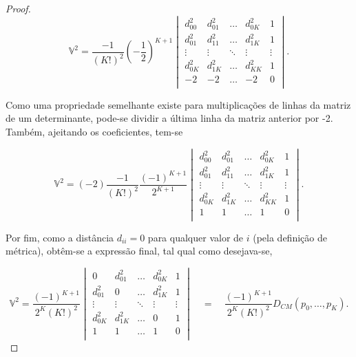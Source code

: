 \begin{teorema}
\begin{proof}
		\begin{equation*}
			\mathbb{V}^2 = \frac{-1}{(K!)^2}\left( -\frac{1}{2}\right)^{K+1} 
			\begin{vmatrix}
				d^2_{00} & d^2_{01} & \ldots & d^2_{0K} & 1\\ 
				d^2_{01} & d^2_{11} & \ldots & d^2_{1K} & 1\\ 
				\vdots & \vdots & \ddots & \vdots & \vdots \\ 
				d^2_{0K} & d^2_{1K} & \ldots & d^2_{KK} & 1\\
				-2 & -2 & \ldots & -2 & 0\\ 
			\end{vmatrix}.
		\end{equation*}
		
		\noindent Como uma propriedade semelhante existe para multiplicações de linhas da matriz de um determinante, pode-se dividir a última linha da matriz anterior por -2. Também, ajeitando os coeficientes, tem-se
		
		\begin{equation*}
			\mathbb{V}^2 = (-2) \frac{-1}{(K!)^2}\frac{(-1)^{K+1}}{2^{K+1}} 
			\begin{vmatrix}
				d^2_{00} & d^2_{01} & \ldots & d^2_{0K} & 1\\ 
				d^2_{01} & d^2_{11} & \ldots & d^2_{1K} & 1\\ 
				\vdots & \vdots & \ddots & \vdots & \vdots \\ 
				d^2_{0K} & d^2_{1K} & \ldots & d^2_{KK} & 1\\
				1 & 1 & \ldots & 1 & 0\\ 
			\end{vmatrix}.
		\end{equation*}
		
		\noindent Por fim, como a distância $d_{ii} = 0$ para qualquer valor de $i$ (pela definição de métrica), obtêm-se a expressão final, tal qual como desejava-se,
		
		\begin{equation*}
			\mathbb{V}^2 = \frac{(-1)^{K+1}}{2^{K}(K!)^2} 
			\begin{vmatrix}
				0 & d^2_{01} & \ldots & d^2_{0K} & 1\\ 
				d^2_{01} & 0 & \ldots & d^2_{1K} & 1\\ 
				\vdots & \vdots & \ddots & \vdots & \vdots \\ 
				d^2_{0K} & d^2_{1K} & \ldots & 0 & 1\\
				1 & 1 & \ldots & 1 & 0\\ 
			\end{vmatrix} \quad = \quad \frac{(-1)^{K+1}}{2^{K}(K!)^2} D_{CM}(p_0,\dots,p_K).
		\end{equation*}
	\end{proof}	
\end{teorema}

